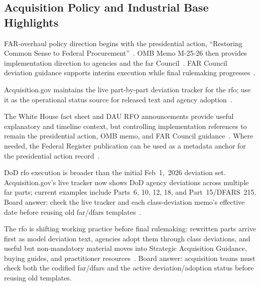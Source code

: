 \documentclass[../main.tex]{subfiles}
\begin{document}
\subsection{Acquisition Policy and Industrial Base Highlights}
\begin{description}[style=nextline,labelsep=0.5em,font=\bfseries]
  \item[\textbf{Authority stack for the RFO.}] FAR-overhaul policy direction begins with the presidential action, ``Restoring Common Sense to Federal Procurement''~\autocite{WH-EO-Restoring-Common-Sense-Procurement-2025}. OMB Memo M-25-26 then provides implementation direction to agencies and the \ac{far} Council~\autocite{OMB-M-25-26-Overhauling-FAR-2025}. FAR Council deviation guidance supports interim execution while final rulemaking progresses~\autocite{FAR-Council-Deviation-Guidance-RFO-2025}.
  \item[\textbf{Live implementation tracker.}] Acquisition.gov maintains the live part-by-part deviation tracker for the \ac{rfo}; use it as the operational status source for released text and agency adoption~\autocite{FAR-Overhaul-Deviation-Guide-2026,FAR-Overhaul-RFO-2026}.
  \item[\textbf{Context vs.\ controlling references.}] The White House fact sheet and DAU RFO announcements provide useful explanatory and timeline context, but controlling implementation references to remain the presidential action, OMB memo, and FAR Council guidance~\autocite{WH-FactSheet-Restoring-Common-Sense-Procurement-2025,DAU-FAR-Overhaul-Announcement-2025}. Where needed, the Federal Register publication can be used as a metadata anchor for the presidential action record~\autocite{FR-EO-Restoring-Common-Sense-Procurement-2025}.
  \item[\textbf{Current DoD execution.}] DoD \ac{rfo} execution is broader than the initial Feb~1,~2026 deviation set. Acquisition.gov's live tracker now shows DoD agency deviations across multiple \ac{far} parts; current examples include Parts~6, 10, 12, 18, and Part~15/DFARS~215. Board answer: check the live tracker and each class-deviation memo's effective date before reusing old \ac{far}/\ac{dfars} templates~\autocite{FAR-Overhaul-Deviation-Guide-2026,DoD-RFO-Deviation-Part6-2026,DoD-RFO-Deviation-Part10-2026,DoD-RFO-Deviation-Part12-2026,DoD-RFO-Deviation-Part18-2026,DFARS-Part215-Deviation-2026}.
  \item[\textbf{RFO practical effects.}] The \ac{rfo} is shifting working practice before final rulemaking: rewritten parts arrive first as model deviation text, agencies adopt them through class deviations, and useful but non-mandatory material moves into Strategic Acquisition Guidance, buying guides, and practitioner resources~\autocite{FAR-Overhaul-FAQ-2026,FAR-Overhaul-Deviation-Guide-2026}. Board answer: acquisition teams must check both the codified \ac{far}/\ac{dfars} and the active deviation/adoption status before reusing old templates.

\end{description}
\end{document}
